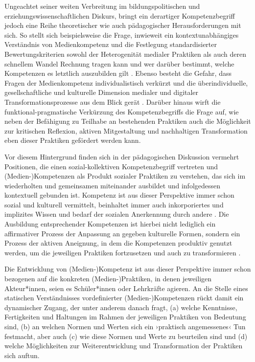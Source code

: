 \documentclass[
  a4paper,
]{book}
\begin{document}
Ungeachtet seiner weiten Verbreitung im bildungspolitischen und erziehungswissenschaftlichen Diskurs, bringt ein derartiger Kompetenzbegriff jedoch eine Reihe theoretischer wie auch pädagogischer Herausforderungen mit sich. So stellt sich beispielsweise die Frage, inwieweit ein kontextunabhängiges Verständnis von Medienkompetenz und die Festlegung standardisierter Bewertungskriterien sowohl der Heterogenität medialer Praktiken als auch deren schnellem Wandel Rechnung tragen kann und wer darüber bestimmt, welche Kompetenzen es letztlich auszubilden gilt \citep{kammerlEnkulturationshilfenDigitalenGesellschaft2014}. Ebenso besteht die Gefahr, dass Fragen der Medienkompetenz individualistisch verkürzt und die überindividuelle, gesellschaftliche und kulturelle Dimension medialer und digitaler Transformationsprozesse aus dem Blick gerät \citep{baackeMedienkompetenzBegrifflichkeitUnd1996}. Darüber hinaus wirft die funktional-pragmatische Verkürzung des Kompetenzbegriffs die Frage auf, wie neben der Befähigung zu Teilhabe an bestehenden Praktiken auch die Möglichkeit zur kritischen Reflexion, aktiven Mitgestaltung und nachhaltigen Transformation eben dieser Praktiken gefördert werden kann.

Vor diesem Hintergrund finden sich in der pädagogischen Diskussion vermehrt Positionen, die einen sozial-kollektiven Kompetenzbegriff vertreten und (Medien-)Kompetenzen als Produkt sozialer Praktiken zu verstehen, das sich im wiederholten und gemeinsamen miteinander ausbildet und infolgedessen kontextuell gebunden ist. Kompetenz ist aus dieser Perspektive immer schon sozial und kulturell vermittelt, beinhaltet immer auch inkorporiertes und implizites Wissen und bedarf der sozialen Anerkennung durch andere \citetext{\citealp{blohRekonstruktiveEvaluationsforschungIm2022}; \citealp[vgl.][]{huggerMedienkompetenz2022}}. Die Ausbildung entsprechender Kompetenzen ist hierbei nicht lediglich ein affirmativer Prozess der Anpassung an gegeben kulturelle Formen, sondern ein Prozess der aktiven Aneignung, in dem die Kompetenzen produktiv genutzt werden, um die jeweiligen Praktiken fortzusetzen und auch zu transformieren \citep{lochEnkulturationAlsAnthropologischer1968}.

Die Entwicklung von (Medien-)Kompetenz ist aus dieser Perspektive immer schon bezogenen auf die konkreten (Medien-)Praktiken, in denen jeweiligen Akteur*innen, seien es Schüler*innen oder Lehrkräfte agieren. An die Stelle eines statischen Verständnisses vordefinierter (Medien-)Kompetenzen rückt damit ein dynamischer Zugang, der unter anderem danach fragt, (a) welche Kenntnisse, Fertigkeiten und Haltungen im Rahmen der jeweiligen Praktiken von Bedeutung sind, (b) an welchen Normen und Werten sich ein ›praktisch angemessenes‹ Tun festmacht, aber auch (c) wie diese Normen und Werte zu beurteilen sind und (d) welche Möglichkeiten zur Weiterentwicklung und Transformation der Praktiken sich auftun.
\end{document}
